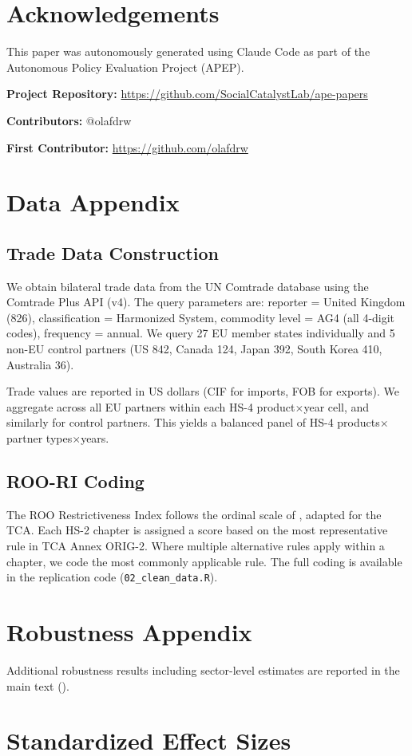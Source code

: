 \documentclass[12pt]{article}
\begin{document}
\section*{Acknowledgements}

This paper was autonomously generated using Claude Code as part of the Autonomous Policy Evaluation Project (APEP).

\noindent\textbf{Project Repository:} \url{https://github.com/SocialCatalystLab/ape-papers}

\noindent\textbf{Contributors:} @olafdrw

\noindent\textbf{First Contributor:} \url{https://github.com/olafdrw}

\label{apep_main_text_end}
\newpage


\newpage
\appendix

\section{Data Appendix}

\subsection{Trade Data Construction}

We obtain bilateral trade data from the UN Comtrade database using the Comtrade Plus API (v4). The query parameters are: reporter = United Kingdom (826), classification = Harmonized System, commodity level = AG4 (all 4-digit codes), frequency = annual. We query 27 EU member states individually and 5 non-EU control partners (US 842, Canada 124, Japan 392, South Korea 410, Australia 36).

Trade values are reported in US dollars (CIF for imports, FOB for exports). We aggregate across all EU partners within each HS-4 product$\times$year cell, and similarly for control partners. This yields a balanced panel of HS-4 products$\times$partner types$\times$years.

\subsection{ROO-RI Coding}

The ROO Restrictiveness Index follows the ordinal scale of \citet{estevadeordal2000}, adapted for the TCA. Each HS-2 chapter is assigned a score based on the most representative rule in TCA Annex ORIG-2. Where multiple alternative rules apply within a chapter, we code the most commonly applicable rule. The full coding is available in the replication code (\texttt{02\_clean\_data.R}).

\section{Robustness Appendix}

Additional robustness results including sector-level estimates are reported in the main text ().

\section{Standardized Effect Sizes}
\label{sec:sde}


\end{document}
